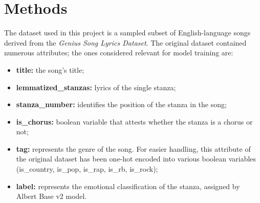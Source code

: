 \chapter*{Methods}
\label{ch:capitolo2}


The dataset used in this project is a sampled subset of English-language
songs derived from the \textit{Genius Song Lyrics Dataset}\textsuperscript{\cite{geniusdataset}}.
The original dataset contained numerous attributes; the ones considered
relevant for model training are:
\begin{itemize}
    \item \textbf{title:} the song's title;

    \item \textbf{lemmatized\_stanzas:} lyrics of the single stanza;
    
    \item \textbf{stanza\_number:} identifies the position of the stanza in the song;

    \item \textbf{is\_chorus:} boolean variable that attests whether the stanza is
        a chorus or not;
    
    \item \textbf{tag:} represents the genre of the song. For easier handling,
        this attribute of the original dataset has been one-hot encoded into various boolean variables
        (is\_country, is\_pop, is\_rap, is\_rb, is\_rock);

    \item \textbf{label:} represents the emotional classification of the stanza,
        assigned by Albert Base v2\textsuperscript{\cite{albert-base-v2}} model.
    
\end{itemize}


